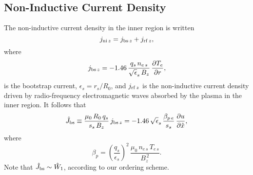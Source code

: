\documentclass[12pt,prb,aps]{revtex4-1}
\begin{document}
\subsection{Non-Inductive Current Density}
The non-inductive current density in the inner region is
written
\begin{equation}
j_{{\rm ni}\,z} = j_{{\rm bs}\,z} + j_{{\rm rf}\,z},
\end{equation}
where 
\begin{equation}
j_{{\rm bs}\,z} = -1.46\,\frac{q_s\,n_{e\,s}}{\sqrt{\epsilon}_s\,B_z}\,\frac{\partial T_e}{\partial r},
\end{equation}
is the bootstrap current,\cite{boot,carrera,fitz} $\epsilon_s=r_s/R_0$, and $j_{{\rm rf}\,z}$ is the non-inductive current density driven by radio-frequency electromagnetic waves absorbed by the plasma in the inner region. 
It follows that
\begin{equation}
\hat{J}_{\rm bs} \equiv \frac{\mu_0\,R_0\,q_s}{s_s\,B_z}\,j_{{\rm bs}\,z} = - 1.46\,\sqrt{\epsilon}_s\,\frac{\beta_{p\,e}}{s_s}\,\frac{\partial u}{\partial \hat{x}},
\end{equation}
where 
\begin{equation}
\beta_p = \left(\frac{q_s}{\epsilon_s}\right)^2\,\frac{\mu_0\,n_{e\,s}\,T_{e\,s}}{B_z^{\,2}}.
\end{equation}
Note that $\hat{J}_{\rm bs}\sim \hat{W}_1$, according to our ordering scheme.
\end{document}
